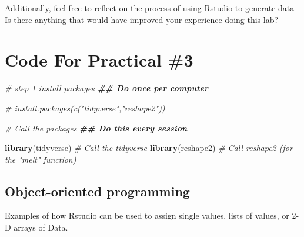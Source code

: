 \documentclass[
]{book}
\newenvironment{Shaded}{\begin{snugshade}}{\end{snugshade}}
\newcommand{\AttributeTok}[1]{\textcolor[rgb]{0.13,0.29,0.53}{#1}}
\newcommand{\CommentTok}[1]{\textcolor[rgb]{0.56,0.35,0.01}{\textit{#1}}}
\newcommand{\ConstantTok}[1]{\textcolor[rgb]{0.56,0.35,0.01}{#1}}
\newcommand{\DocumentationTok}[1]{\textcolor[rgb]{0.56,0.35,0.01}{\textbf{\textit{#1}}}}
\newcommand{\FunctionTok}[1]{\textcolor[rgb]{0.13,0.29,0.53}{\textbf{#1}}}
\newcommand{\NormalTok}[1]{#1}
\newcommand{\SpecialCharTok}[1]{\textcolor[rgb]{0.81,0.36,0.00}{\textbf{#1}}}
\begin{document}
Additionally, feel free to reflect on the process of using Rstudio to generate data - Is there anything that would have improved your experience doing this lab?

\section*{Code For Practical \#3}\label{code-for-practical-3}

\begin{Shaded}
\end{Shaded}

\begin{Shaded}
\begin{Highlighting}[]
\CommentTok{\# step 1 install packages }
\DocumentationTok{\#\# Do once per computer}

\CommentTok{\# install.packages(c("tidyverse","reshape2"))}

\CommentTok{\# Call the packages }
\DocumentationTok{\#\# Do this every session}

\FunctionTok{library}\NormalTok{(tidyverse) }\CommentTok{\# Call the tidyverse}
\FunctionTok{library}\NormalTok{(reshape2) }\CommentTok{\# Call reshape2 (for the "melt" function)}
\end{Highlighting}
\end{Shaded}

\subsection*{Object-oriented programming}\label{object-oriented-programming}

Examples of how Rstudio can be used to assign single values, lists of values, or 2-D arrays of Data.
\end{document}
